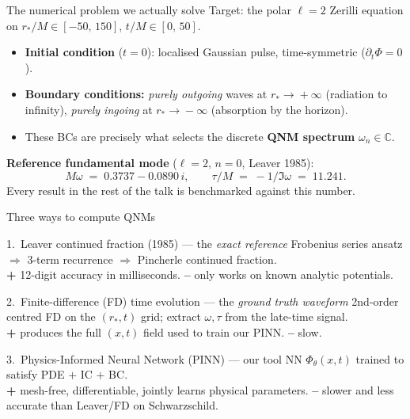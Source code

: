 \documentclass[aspectratio=169, 11pt]{beamer}
\newcommand{\pinn}{PINN}
\newcommand{\qnm}{QNM}
\newcommand{\qnms}{QNMs}
\newcommand{\fd}{FD}
\newcommand{\zer}{Zerilli}
\begin{document}
\begin{frame}{The numerical problem we actually solve}
  Target: the polar $\ell\!=\!2$ \zer{} equation on
  $r_{\!*}/M \in [-50,\,150]$, $t/M \in [0,\,50]$.
  \medskip
  \begin{itemize}
    \item \textbf{Initial condition} ($t=0$): localised Gaussian pulse,
          time-symmetric ($\partial_{t}\Phi = 0$).
    \item \textbf{Boundary conditions:}
          \emph{purely outgoing} waves at $r_{\!*}\!\to\!+\infty$
          (radiation to infinity),
          \emph{purely ingoing} at $r_{\!*}\!\to\!-\infty$
          (absorption by the horizon).
    \item These BCs are precisely what selects the discrete
          \textbf{\qnm{} spectrum} $\omega_{n}\in\mathbb{C}$.
  \end{itemize}
  \medskip
  \textbf{Reference fundamental mode} ($\ell\!=\!2,\,n\!=\!0$, Leaver 1985):
  \[
    M\omega \;=\; 0.3737 - 0.0890\,i,
    \qquad \tau/M \;=\; -1/\Im\omega \;=\; 11.241 .
  \]
  Every result in the rest of the talk is benchmarked against this number.
\end{frame}

\begin{frame}{Three ways to compute \qnms{}}
  \footnotesize
  \begin{block}{1.\ Leaver continued fraction (1985) --- the \emph{exact reference}}
    Frobenius series ansatz $\Rightarrow$ 3-term recurrence
    $\Rightarrow$ Pincherle continued fraction. \\
    \textbf{+} 12-digit accuracy in milliseconds.
    \quad \textbf{--} only works on known analytic potentials.
  \end{block}
  \begin{block}{2.\ Finite-difference (\fd{}) time evolution --- the \emph{ground truth waveform}}
    2nd-order centred FD on the $(r_{\!*}, t)$ grid;
    extract $\omega,\tau$ from the late-time signal. \\
    \textbf{+} produces the full $(x,t)$ field used to train our PINN.
    \quad \textbf{--} slow.
  \end{block}
  \begin{block}{3.\ Physics-Informed Neural Network (\pinn{}) --- our tool}
    NN $\Phi_{\theta}(x,t)$ trained to satisfy PDE $+$ IC $+$ BC. \\
    \textbf{+} mesh-free, differentiable, jointly learns physical parameters.
    \quad \textbf{--} slower and less accurate than Leaver/\fd{} on Schwarzschild.
  \end{block}
\end{frame}
\end{document}
